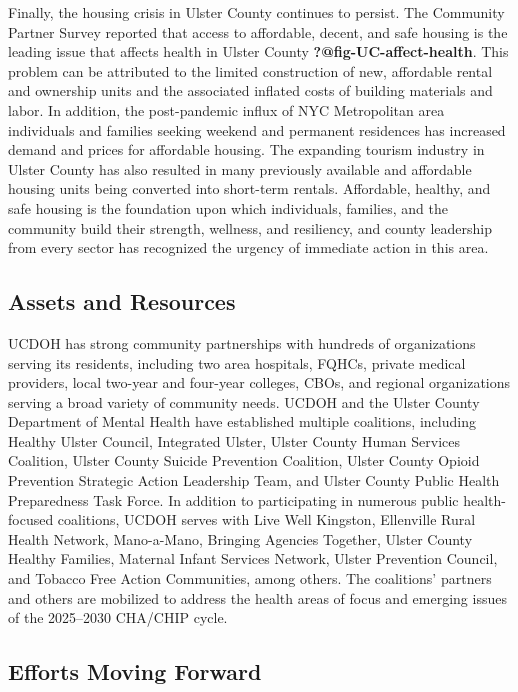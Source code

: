 \documentclass[
  english,
  letterpaper,
]{report}
\begin{document}
Finally, the housing crisis in Ulster County continues to persist. The
Community Partner Survey reported that access to affordable, decent, and
safe housing is the leading issue that affects health in Ulster County
\textbf{?@fig-UC-affect-health}. This problem can be attributed to the
limited construction of new, affordable rental and ownership units and
the associated inflated costs of building materials and labor. In
addition, the post-pandemic influx of NYC Metropolitan area individuals
and families seeking weekend and permanent residences has increased
demand and prices for affordable housing. The expanding tourism industry
in Ulster County has also resulted in many previously available and
affordable housing units being converted into short-term rentals.
Affordable, healthy, and safe housing is the foundation upon which
individuals, families, and the community build their strength, wellness,
and resiliency, and county leadership from every sector has recognized
the urgency of immediate action in this area.

\subsection{Assets and Resources}\label{assets-and-resources-4}

UCDOH has strong community partnerships with hundreds of organizations
serving its residents, including two area hospitals, FQHCs, private
medical providers, local two-year and four-year colleges, CBOs, and
regional organizations serving a broad variety of community needs. UCDOH
and the Ulster County Department of Mental Health have established
multiple coalitions, including Healthy Ulster Council, Integrated
Ulster, Ulster County Human Services Coalition, Ulster County Suicide
Prevention Coalition, Ulster County Opioid Prevention Strategic Action
Leadership Team, and Ulster County Public Health Preparedness Task
Force. In addition to participating in numerous public health-focused
coalitions, UCDOH serves with Live Well Kingston, Ellenville Rural
Health Network, Mano-a-Mano, Bringing Agencies Together, Ulster County
Healthy Families, Maternal Infant Services Network, Ulster Prevention
Council, and Tobacco Free Action Communities, among others. The
coalitions' partners and others are mobilized to address the health
areas of focus and emerging issues of the 2025--2030 CHA/CHIP cycle.

\subsection{Efforts Moving Forward}\label{efforts-moving-forward}
\end{document}
